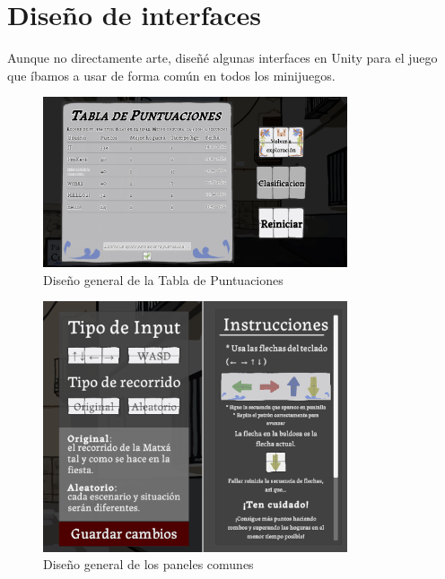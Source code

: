 \documentclass[12pt]{article}
\begin{document}
\section{Diseño de interfaces}
    Aunque no directamente arte, diseñé algunas interfaces en Unity para el juego que íbamos a usar de forma común en todos los minijuegos.
    \begin{figure}[h!]
        \centering
        \includegraphics[width=0.8\textwidth]{imgs/leaderboard.png}
        \caption{Diseño general de la Tabla de Puntuaciones}
        \label{fig:diseno_tabla_puntuaciones}
    \end{figure}

    \begin{figure}[h!]
        \centering
        \includegraphics[width=0.8\textwidth]{imgs/common_panels.png}
        \caption{Diseño general de los paneles comunes}
        \label{fig:diseno_paneles_comunes}
    \end{figure}
\end{document}
